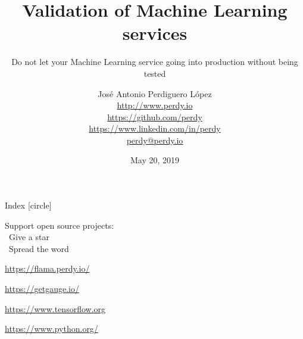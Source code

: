 \documentclass[final, 9pt, svgnames, xcolor=table]{beamerPerdy}
\title{Validation of Machine Learning services}
\subtitle{Do not let your Machine Learning service going into production without being tested}
\author[J. A. Perdiguero López]{
José Antonio Perdiguero López\\
\href{http://www.perdy.io}{\scriptsize{\faGlobe\; http://www.perdy.io}}\\
\href{https://github.com/perdy}{\scriptsize{\faGithub\; https://github.com/perdy}}\\
\href{https://www.linkedin.com/in/perdy}{\scriptsize{\faLinkedin\; https://www.linkedin.com/in/perdy}}\\
\href{mailto://perdy@perdy.io}{\scriptsize{\faAt\; perdy@perdy.io}}}
\institute[Piksel]{Software Architect @ Piksel}
\date{May 20, 2019}
\begin{document}
\begin{frame}
    \titlepage
\end{frame}

\begin{frame}{Index}
    [circle]
    \tableofcontents
\end{frame}






\begin{frame}[standout]
    \Huge{Support open source projects: \\ \faStar \, Give a star\\ \faBullhorn \, Spread the word}

    \qquad

    \href{https://flama.perdy.io}{https://flama.perdy.io/}

    \href{https://getgauge.io/}{https://getgauge.io/}

    \href{https://www.tensorflow.org/}{https://www.tensorflow.org}

    \href{https://www.python.org/}{https://www.python.org/}
\end{frame}
\end{document}
